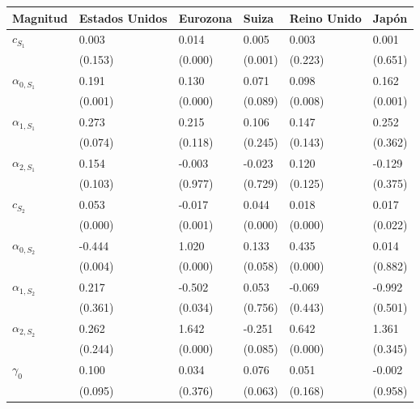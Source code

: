 \documentclass[titlepage, 12pt]{article}
\begin{document}
\begin{table}
    \centering
    \singlespacing
    \begin{tabular}{llllll}
        \toprule
        Magnitud          & Estados Unidos & Eurozona & Suiza   & Reino Unido & Japón   \\
        \midrule
        $c_{S_1}$         & 0.003          & 0.014    & 0.005   & 0.003       & 0.001   \\
                          & (0.153)        & (0.000)  & (0.001) & (0.223)     & (0.651) \\
        $\alpha_{0,S_1}$  & 0.191          & 0.130    & 0.071   & 0.098       & 0.162   \\
                          & (0.001)        & (0.000)  & (0.089) & (0.008)     & (0.001) \\
        $\alpha_{1, S_1}$ & 0.273          & 0.215    & 0.106   & 0.147       & 0.252   \\
                          & (0.074)        & (0.118)  & (0.245) & (0.143)     & (0.362) \\
        $\alpha_{2, S_1}$ & 0.154          & -0.003   & -0.023  & 0.120       & -0.129  \\
                          & (0.103)        & (0.977)  & (0.729) & (0.125)     & (0.375) \\
        $c_{S_2}$         & 0.053          & -0.017   & 0.044   & 0.018       & 0.017   \\
                          & (0.000)        & (0.001)  & (0.000) & (0.000)     & (0.022) \\
        $\alpha_{0,S_2}$  & -0.444         & 1.020    & 0.133   & 0.435       & 0.014   \\
                          & (0.004)        & (0.000)  & (0.058) & (0.000)     & (0.882) \\
        $\alpha_{1, S_2}$ & 0.217          & -0.502   & 0.053   & -0.069      & -0.992  \\
                          & (0.361)        & (0.034)  & (0.756) & (0.443)     & (0.501) \\
        $\alpha_{2, S_2}$ & 0.262          & 1.642    & -0.251  & 0.642       & 1.361   \\
                          & (0.244)        & (0.000)  & (0.085) & (0.000)     & (0.345) \\
        $\gamma_0$        & 0.100          & 0.034    & 0.076   & 0.051       & -0.002  \\
                          & (0.095)        & (0.376)  & (0.063) & (0.168)     & (0.958) \\

\end{tabular}
\end{table}
\end{document}
